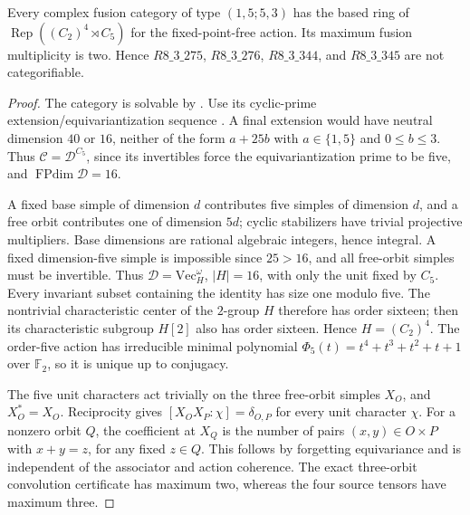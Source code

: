 \begin{theorem}\label{thm:m3-dimension80}
Every complex fusion category of type $(1,5;5,3)$ has the based ring of
$\operatorname{Rep}((C_2)^4\rtimes C_5)$ for the fixed-point-free action.
Its maximum fusion multiplicity is two. Hence $R8\_3\_275$,
$R8\_3\_276$, $R8\_3\_344$, and $R8\_3\_345$ are not categorifiable.
\end{theorem}
\begin{proof}
The category is solvable by \cite[Theorem 1.6]{ENOSolvable}. Use its
cyclic-prime extension/equivariantization sequence
\cite[Definition 1.2(ii), Proposition 4.4]{ENOSolvable}. A final
extension would have neutral dimension $40$ or $16$, neither of the
form $a+25b$ with $a\in\{1,5\}$ and $0\le b\le3$.
Thus $\mathcal C=\mathcal D^{C_5}$, since its invertibles force the
equivariantization prime to be five, and $\operatorname{FPdim}\mathcal D=16$.

A fixed base simple of dimension $d$ contributes five simples of
dimension $d$, and a free orbit contributes one of dimension $5d$;
cyclic stabilizers have trivial projective multipliers. Base dimensions
are rational algebraic integers, hence integral. A fixed dimension-five
simple is impossible since $25>16$, and all free-orbit simples must be
invertible. Thus $\mathcal D=\mathrm{Vec}_H^\omega$, $|H|=16$, with
only the unit fixed by $C_5$.
Every invariant subset containing the identity has size one modulo five.
The nontrivial characteristic center of the $2$-group $H$ therefore has
order sixteen; then its characteristic subgroup $H[2]$ also has order
sixteen. Hence $H=(C_2)^4$. The order-five action has irreducible minimal
polynomial $\Phi_5(t)=t^4+t^3+t^2+t+1$ over $\mathbb F_2$, so it is
unique up to conjugacy.

The five unit characters act trivially on the three free-orbit simples
$X_O$, and $X_O^*=X_O$. Reciprocity gives
$[X_OX_P:\chi]=\delta_{O,P}$ for every unit character $\chi$.
For a nonzero orbit $Q$, the coefficient at $X_Q$ is the number of
pairs $(x,y)\in O\times P$ with $x+y=z$, for any fixed $z\in Q$.
This follows by forgetting equivariance and is independent of the
associator and action coherence. The exact three-orbit convolution
certificate has maximum two, whereas the four source tensors have
maximum three.
\end{proof}

